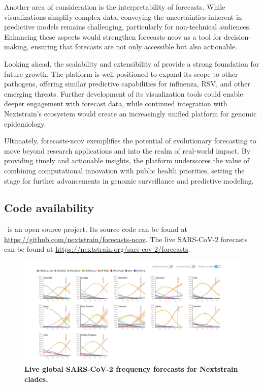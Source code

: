 Another area of consideration is the interpretability of forecasts.
While visualizations simplify complex data, conveying the uncertainties inherent in predictive models remains challenging, particularly for non-technical audiences.
Enhancing these aspects would strengthen forecasts-ncov as a tool for decision-making, ensuring that forecasts are not only accessible but also actionable.

Looking ahead, the scalability and extensibility of \forecastsNcov provide a strong foundation for future growth.
The platform is well-positioned to expand its scope to other pathogens, offering similar predictive capabilities for influenza, RSV, and other emerging threats.
Further development of its visualization tools could enable deeper engagement with forecast data, while continued integration with Nextstrain’s ecosystem would create an increasingly unified platform for genomic epidemiology.

Ultimately, forecasts-ncov exemplifies the potential of evolutionary forecasting to move beyond research applications and into the realm of real-world impact.
By providing timely and actionable insights, the platform underscores the value of combining computational innovation with public health priorities, setting the stage for further advancements in genomic surveillance and predictive modeling.


\subsection*{Code availability}

\forecastsNcov\ is an open source project.
Its source code can be found at \href{https://github.com/nextstrain/forecasts-ncov}{https://github.com/nextstrain/forecasts-ncov}.
The live SARS-CoV-2 forecasts can be found at \href{https://nextstrain.org/sars-cov-2/forecasts}{https://nextstrain.org/sars-cov-2/forecasts}.

\begin{figure}[h]
    \centering
    \includegraphics[width=1.0\linewidth]{./figures/clade_frequencies.png}
    \caption{
      \textbf{Live global SARS-CoV-2 frequency forecasts for Nextstrain clades.}
    }
    \label{fig:fn_clade_frequencies}
\end{figure}


